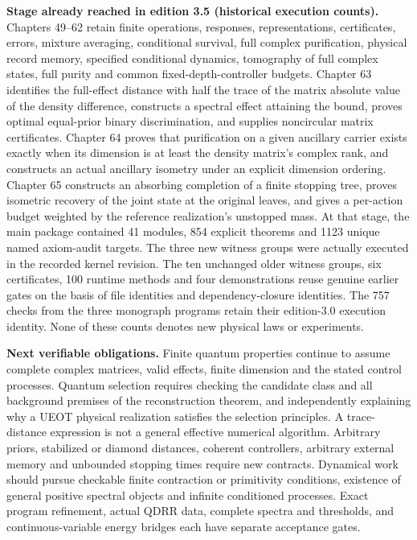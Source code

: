 \documentclass[
  11pt,
  oneside]{book}
\begin{document}
\textbf{Stage already reached in edition 3.5 (historical execution
counts).} Chapters 49--62 retain finite operations, responses,
representations, certificates, errors, mixture averaging, conditional
survival, full complex purification, physical record memory, specified
conditional dynamics, tomography of full complex states, full purity and
common fixed-depth-controller budgets. Chapter 63 identifies the
full-effect distance with half the trace of the matrix absolute value of
the density difference, constructs a spectral effect attaining the
bound, proves optimal equal-prior binary discrimination, and supplies
noncircular matrix certificates. Chapter 64 proves that purification on
a given ancillary carrier exists exactly when its dimension is at least
the density matrix's complex rank, and constructs an actual ancillary
isometry under an explicit dimension ordering. Chapter 65 constructs an
absorbing completion of a finite stopping tree, proves isometric
recovery of the joint state at the original leaves, and gives a
per-action budget weighted by the reference realization's unstopped
mass. At that stage, the main package contained 41 modules, 854 explicit
theorems and 1123 unique named axiom-audit targets. The three new
witness groups were actually executed in the recorded kernel revision.
The ten unchanged older witness groups, six certificates, 100 runtime
methods and four demonstrations reuse genuine earlier gates on the basis
of file identities and dependency-closure identities. The 757 checks
from the three monograph programs retain their edition-3.0 execution
identity. None of these counts denotes new physical laws or experiments.

\textbf{Next verifiable obligations.} Finite quantum properties continue
to assume complete complex matrices, valid effects, finite dimension and
the stated control processes. Quantum selection requires checking the
candidate class and all background premises of the reconstruction
theorem, and independently explaining why a UEOT physical realization
satisfies the selection principles. A trace-distance expression is not a
general effective numerical algorithm. Arbitrary priors, stabilized or
diamond distances, coherent controllers, arbitrary external memory and
unbounded stopping times require new contracts. Dynamical work should
pursue checkable finite contraction or primitivity conditions, existence
of general positive spectral objects and infinite conditioned processes.
Exact program refinement, actual QDRR data, complete spectra and
thresholds, and continuous-variable energy bridges each have separate
acceptance gates.
\end{document}
